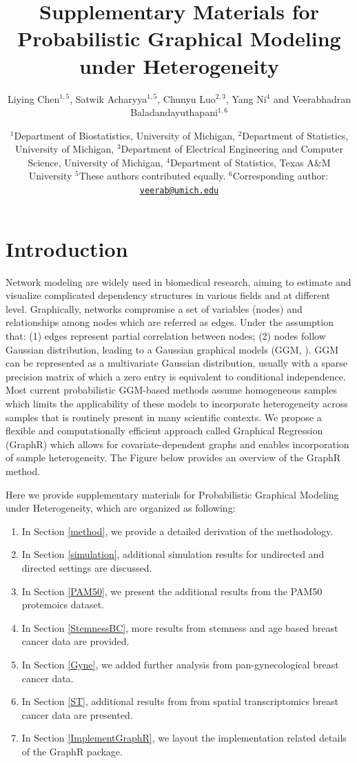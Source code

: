 \documentclass[
]{book}
\title{Supplementary Materials for Probabilistic Graphical Modeling under Heterogeneity}
\author{Liying Chen\(^{1,5}\), Satwik Acharyya\(^{1,5}\), Chunyu Luo\(^{2,3}\), Yang Ni\(^4\) and Veerabhadran Baladandayuthapani\(^{1,6}\)}
\date{\(^1\)Department of Biostatistics, University of Michigan, \(^2\)Department of Statistics, University of Michigan, \(^3\)Department of Electrical Engineering and Computer Science, University of Michigan, \(^4\)Department of Statistics, Texas A\&M University \(^5\)These authors contributed equally. \(^6\)Corresponding author\(:\) \href{mailto:veerab@umich.edu}{\nolinkurl{veerab@umich.edu}}}
\providecommand{\tightlist}{%
  \setlength{\itemsep}{0pt}\setlength{\parskip}{0pt}}
\begin{document}
\maketitle

{
\setcounter{tocdepth}{1}
\tableofcontents
}
\hypertarget{appendix-supplementary-materials}{%
\appendix}


\hypertarget{introduction}{%
\chapter*{Introduction}\label{introduction}}

Network modeling are widely used in biomedical research, aiming to estimate and visualize complicated dependency structures in various fields and at different level. Graphically, networks compromise a set of variables (nodes) and relationships among nodes which are referred as edges. Under the assumption that: (1) edges represent partial correlation between nodes; (2) nodes follow Gaussian distribution, leading to a Gaussian graphical models (GGM, \citet{lauritzen1996graphical}). GGM can be represented as a multivariate Gaussian distribution, usually with a sparse precision matrix of which a zero entry is equivalent to conditional independence. Most current probabilistic GGM-based methods assume homogeneous samples which limits the applicability of these models to incorporate heterogeneity across samples that is routinely present in many scientific contexts. We propose a flexible and computationally efficient approach called Graphical Regression (GraphR) which allows for covariate-dependent graphs and enables incorporation of sample heterogeneity. The Figure below provides an overview of the GraphR method.

Here we provide supplementary materials for Probabilistic Graphical Modeling under Heterogeneity, which are organized as following:

\begin{enumerate}
\def\labelenumi{\arabic{enumi}.}
\tightlist
\item
  In Section \ref{method}, we provide a detailed derivation of the methodology.
\item
  In Section \ref{simulation}, additional simulation results for undirected and directed settings are discussed.
\item
  In Section \ref{PAM50}, we present the additional results from the PAM50 protemoics dataset.
\item
  In Section \ref{StemnessBC}, more results from stemness and age based breast cancer data are provided.\\
\item
  In Section \ref{Gyne}, we added further analysis from pan-gynecological breast cancer data.
\item
  In Section \ref{ST}, additional results from from spatial transcriptomics breast cancer data are presented.
\item
  In Section \ref{ImplementGraphR}, we layout the implementation related details of the GraphR package.
\end{enumerate}
\end{document}
